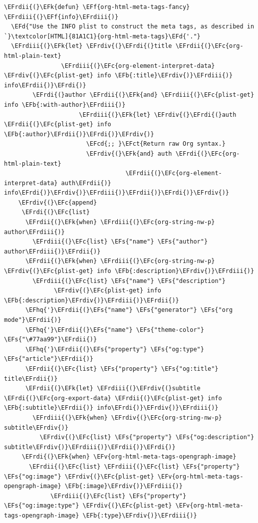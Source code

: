 \documentclass{scrartcl}
\newcommand{\EFk}[1]{\textcolor{EFk}{#1}} %
\newcommand{\EFd}[1]{\textcolor{EFd}{#1}} %
\newcommand{\EFs}[1]{\textcolor{EFs}{#1}} %
\newcommand{\EFb}[1]{\textcolor{EFb}{#1}} %
\newcommand{\EFct}[1]{\textcolor{EFct}{#1}} %
\newcommand{\EFc}[1]{\textcolor{EFc}{#1}} %
\newcommand{\EFv}[1]{\textcolor{EFv}{#1}} %
\newcommand{\EFf}[1]{\textcolor{EFf}{#1}} %
\newcommand{\EFcd}[1]{\textcolor{EFcd}{#1}} %
\newcommand{\EFhq}[1]{#1} %
\newcommand{\EFrdi}[1]{#1} %
\newcommand{\EFrdii}[1]{#1} %
\newcommand{\EFrdiii}[1]{#1} %
\newcommand{\EFrdiv}[1]{#1} %
\begin{document}
\begin{Code}
\begin{Verbatim}[]
\EFrdii{(}\EFk{defun} \EFf{org-html-meta-tags-fancy} \EFrdiii{(}\EFf{info}\EFrdiii{)}
  \EFd{"Use the INFO plist to construct the meta tags, as described in `}\textcolor[HTML]{81A1C1}{org-html-meta-tags}\EFd{'."}
  \EFrdiii{(}\EFk{let} \EFrdiv{(}\EFrdi{(}title \EFrdii{(}\EFc{org-html-plain-text}
                \EFrdiii{(}\EFc{org-element-interpret-data} \EFrdiv{(}\EFc{plist-get} info \EFb{:title}\EFrdiv{)}\EFrdiii{)} info\EFrdii{)}\EFrdi{)}
        \EFrdi{(}author \EFrdii{(}\EFk{and} \EFrdiii{(}\EFc{plist-get} info \EFb{:with-author}\EFrdiii{)}
                     \EFrdiii{(}\EFk{let} \EFrdiv{(}\EFrdi{(}auth \EFrdii{(}\EFc{plist-get} info \EFb{:author}\EFrdii{)}\EFrdi{)}\EFrdiv{)}
                       \EFcd{;; }\EFct{Return raw Org syntax.}
                       \EFrdiv{(}\EFk{and} auth \EFrdi{(}\EFc{org-html-plain-text}
                                  \EFrdii{(}\EFc{org-element-interpret-data} auth\EFrdii{)} info\EFrdi{)}\EFrdiv{)}\EFrdiii{)}\EFrdii{)}\EFrdi{)}\EFrdiv{)}
    \EFrdiv{(}\EFc{append}
     \EFrdi{(}\EFc{list}
      \EFrdii{(}\EFk{when} \EFrdiii{(}\EFc{org-string-nw-p} author\EFrdiii{)}
        \EFrdiii{(}\EFc{list} \EFs{"name"} \EFs{"author"} author\EFrdiii{)}\EFrdii{)}
      \EFrdii{(}\EFk{when} \EFrdiii{(}\EFc{org-string-nw-p} \EFrdiv{(}\EFc{plist-get} info \EFb{:description}\EFrdiv{)}\EFrdiii{)}
        \EFrdiii{(}\EFc{list} \EFs{"name"} \EFs{"description"}
              \EFrdiv{(}\EFc{plist-get} info \EFb{:description}\EFrdiv{)}\EFrdiii{)}\EFrdii{)}
      \EFhq{'}\EFrdii{(}\EFs{"name"} \EFs{"generator"} \EFs{"org mode"}\EFrdii{)}
      \EFhq{'}\EFrdii{(}\EFs{"name"} \EFs{"theme-color"} \EFs{"\#77aa99"}\EFrdii{)}
      \EFhq{'}\EFrdii{(}\EFs{"property"} \EFs{"og:type"} \EFs{"article"}\EFrdii{)}
      \EFrdii{(}\EFc{list} \EFs{"property"} \EFs{"og:title"} title\EFrdii{)}
      \EFrdii{(}\EFk{let} \EFrdiii{(}\EFrdiv{(}subtitle \EFrdi{(}\EFc{org-export-data} \EFrdii{(}\EFc{plist-get} info \EFb{:subtitle}\EFrdii{)} info\EFrdi{)}\EFrdiv{)}\EFrdiii{)}
        \EFrdiii{(}\EFk{when} \EFrdiv{(}\EFc{org-string-nw-p} subtitle\EFrdiv{)}
          \EFrdiv{(}\EFc{list} \EFs{"property"} \EFs{"og:description"} subtitle\EFrdiv{)}\EFrdiii{)}\EFrdii{)}\EFrdi{)}
     \EFrdi{(}\EFk{when} \EFv{org-html-meta-tags-opengraph-image}
       \EFrdii{(}\EFc{list} \EFrdiii{(}\EFc{list} \EFs{"property"} \EFs{"og:image"} \EFrdiv{(}\EFc{plist-get} \EFv{org-html-meta-tags-opengraph-image} \EFb{:image}\EFrdiv{)}\EFrdiii{)}
             \EFrdiii{(}\EFc{list} \EFs{"property"} \EFs{"og:image:type"} \EFrdiv{(}\EFc{plist-get} \EFv{org-html-meta-tags-opengraph-image} \EFb{:type}\EFrdiv{)}\EFrdiii{)}

\end{Verbatim}
\end{Code}
\end{document}
